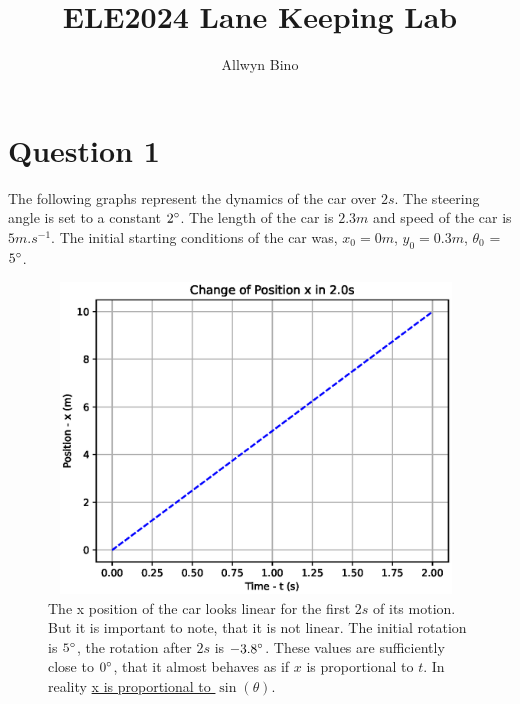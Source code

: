 \documentclass[10pt]{article}
\date{}
\title{ELE2024 Lane Keeping Lab}
\author{Allwyn Bino}
\begin{document}
\maketitle

\section{Question 1}
The following graphs represent the dynamics of the car over $2\si{s}$. The steering angle is set to a constant $2\degree$. The length of the car is $2.3\si{m}$ and speed of the car is $5\si{m.s^{-1}}$. The initial starting conditions of the car was, $x_0 = 0\si{m}$, $y_0 = 0.3\si{m}$, $\theta_0$ = $5\degree$.

\begin{figure}
\centering
\includegraphics[width=11cm, height=8.25cm]{q1_x_t.eps}
\caption
{The x position of the car looks linear for the first $2\si{s}$ of its motion. But it is important to note, that it is not linear. The initial rotation is $5\degree$, the rotation after $2\si{s}$ is $-3.8\degree$. These values are sufficiently close to $0 \degree$, that it almost behaves as if $x$ is proportional to $t$. In reality \hyperref[3:x_prop]{x is proportional to $\sin(\theta)$}.}
\end{figure}
\end{document}
